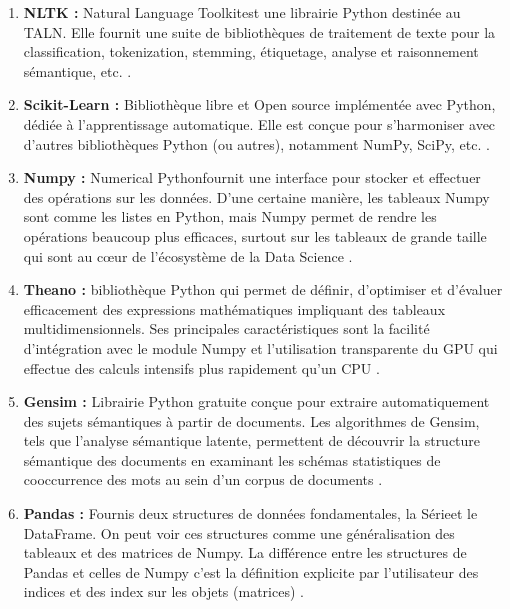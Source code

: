             \begin{enumerate}[leftmargin=*]
                \item{\textbf{NLTK : }}
                \textquotedbl Natural Language Toolkit\textquotedbl est une librairie Python destinée au TALN. Elle fournit une suite de bibliothèques de traitement de texte pour la classification, tokenization, stemming, étiquetage, analyse et raisonnement sémantique, etc. \cite{nltk}.\\

                \item{\textbf{Scikit-Learn : }}
                Bibliothèque libre et Open source implémentée avec Python, dédiée à l'apprentissage automatique. Elle est conçue pour s'harmoniser avec d'autres bibliothèques Python (ou autres), notamment NumPy, SciPy, etc. \cite{scikit}.\\

                \item{\textbf{Numpy : }}
                \textquotedbl Numerical Python\textquotedbl fournit une interface pour stocker et effectuer des opérations sur les données. D'une certaine manière, les tableaux Numpy sont comme les listes en Python, mais Numpy permet de rendre les opérations beaucoup plus efficaces, surtout sur les tableaux de grande taille qui sont au cœur de l'écosystème de la Data Science \cite{numpy}.\\

                \item{\textbf{Theano : }}
                bibliothèque Python qui permet de définir, d'optimiser et d'évaluer efficacement des expressions mathématiques impliquant des tableaux multidimensionnels. Ses principales caractéristiques sont la facilité d'intégration avec le module Numpy et l'utilisation transparente du GPU qui effectue des calculs intensifs plus rapidement qu'un CPU \cite{theano}.\\
                
                \item{\textbf{Gensim : }}
                Librairie Python gratuite conçue pour extraire automatiquement des sujets sémantiques à partir de documents. Les algorithmes de Gensim, tels que l'analyse sémantique latente, permettent de découvrir la structure sémantique des documents en examinant les schémas statistiques de cooccurrence des mots au sein d'un corpus de documents \cite{gensim}.\\

                \item{\textbf{Pandas : }}
                Fournis deux structures de données fondamentales, la \textquotedbl Série\textquotedbl et le \textquotedbl DataFrame\textquotedbl. On peut voir ces structures comme une généralisation des tableaux et des matrices de Numpy. La différence entre les structures de Pandas et celles de Numpy c'est la définition explicite par l'utilisateur des indices et des index sur les objets (matrices) \cite{pandas}.\\


\end{enumerate}
